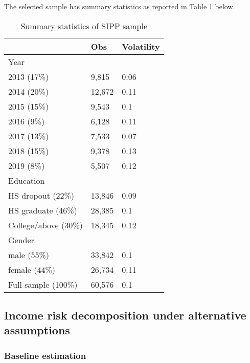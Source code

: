The selected sample has summary statistics as reported in Table \ref{tab:sipp_sum_stat} below. 

\begin{table}[!ht]
    \centering
    \caption{Summary statistics of SIPP sample}
    \label{tab:sipp_sum_stat}
\begin{tabular}{lll}
\hline \hline 
                     & Obs    & Volatility \\
                     \hline 
Year                 &        &            \\
\hline 
2013 (17\%)          & 9,815  & 0.06       \\
2014 (20\%)          & 12,672 & 0.11       \\
2015 (15\%)          & 9,543  & 0.1        \\
2016 (9\%)           & 6,128  & 0.11       \\
2017 (13\%)          & 7,533  & 0.07       \\
2018 (15\%)          & 9,378  & 0.13       \\
2019 (8\%)           & 5,507  & 0.12       \\
\hline 
Education                 &        &            \\
\hline 
HS dropout (22\%)    & 13,846 & 0.09       \\
HS graduate (46\%)   & 28,385 & 0.1        \\
College/above (30\%) & 18,345 & 0.12       \\

                     \hline 
Gender               &        &            \\
\hline 
male (55\%)          & 33,842 & 0.1        \\
female (44\%)        & 26,734 & 0.11       \\
\hline \hline 
Full sample (100\%)        & 60,576 & 0.1       \\
\hline \hline 
\end{tabular}
\end{table}

\subsection{Income risk decomposition under alternative assumptions}

\subsubsection{Baseline estimation}

